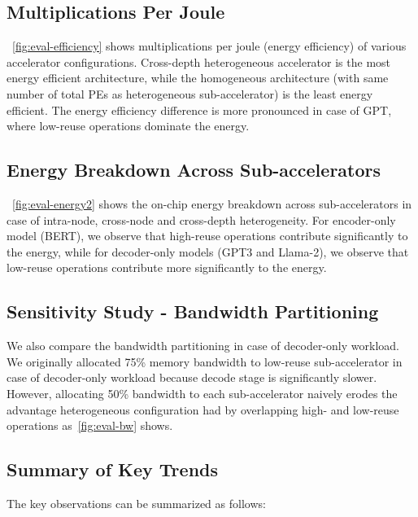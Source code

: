 \subsection{Multiplications Per Joule}

~\autoref{fig:eval-efficiency} shows multiplications per joule (energy efficiency) of various accelerator configurations. Cross-depth heterogeneous accelerator is the most energy efficient architecture, while the homogeneous architecture (with same number of total PEs as heterogeneous sub-accelerator) is the least energy efficient. The energy efficiency difference is more pronounced in case of GPT, where low-reuse operations dominate the energy.

\subsection{Energy Breakdown Across Sub-accelerators}

~\autoref{fig:eval-energy2} shows the on-chip energy breakdown across sub-accelerators in case of intra-node, cross-node and cross-depth heterogeneity. For encoder-only model (BERT), we observe that high-reuse operations contribute significantly to the energy, while for decoder-only models (GPT3 and Llama-2), we observe that low-reuse operations contribute more significantly to the energy.

\subsection{Sensitivity Study - Bandwidth Partitioning}

We also compare the bandwidth partitioning in case of decoder-only workload. We originally allocated 75\% memory bandwidth to low-reuse sub-accelerator in case of decoder-only workload because decode stage is significantly slower. However, allocating 50\% bandwidth to each sub-accelerator naively erodes the advantage heterogeneous configuration had by overlapping high- and low-reuse operations as~\autoref{fig:eval-bw} shows.

\subsection{Summary of Key Trends}

The key observations can be summarized as follows:

